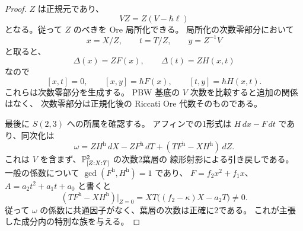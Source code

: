 \begin{proof}
$Z$ は正規元であり、
\[
 VZ=Z(V-\hbar\ell)
\]
となる。従って $Z$ のべきを Ore 局所化できる。
局所化の次数零部分において
\[
 x=X/Z,\qquad t=T/Z,\qquad y=Z^{-1}V
\]
と取ると、
\[
 \Delta(x)=ZF(x),\qquad \Delta(t)=ZH(x,t)
\]
なので
\[
 [x,t]=0,\qquad [x,y]=\hbar F(x),\qquad
 [t,y]=\hbar H(x,t).
\]
これらは次数零部分を生成する。
PBW 基底の $V$ 次数を比較すると追加の関係はなく、
次数零部分は正規化後の Riccati Ore 代数そのものである。

最後に $S(2,3)$ への所属を確認する。
アフィンでの1形式は $H\,dx-F\,dt$ であり、同次化は
\[
 \omega=ZH^{\mathrm h}\,dX-ZF^{\mathrm h}\,dT
            +(TF^{\mathrm h}-XH^{\mathrm h})\,dZ.
\]
これは $V$ を含まず、$\mathbb P^2_{[Z:X:T]}$ の次数2葉層の
線形射影による引き戻しである。
一般の係数について $\gcd(F^{\mathrm h},H^{\mathrm h})=1$ であり、
$F=f_2x^2+f_1x$、$A=a_2t^2+a_1t+a_0$ と書くと
\[
 (TF^{\mathrm h}-XH^{\mathrm h})|_{Z=0}
    =XT\bigl((f_2-\kappa)X-a_2T\bigr)\ne0.
\]
従って $\omega$ の係数に共通因子がなく、葉層の次数は正確に2である。
これが主張した成分内の特別な族を与える。
\end{proof}
